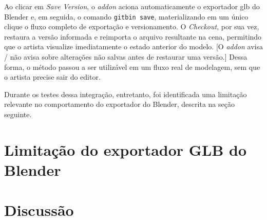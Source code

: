 Ao clicar em \textit{Save Version}, o \textit{addon} aciona automaticamente o exportador \gls{glb} do Blender e, em seguida, o comando \texttt{gitbin save}, materializando em um único clique o fluxo completo de exportação e versionamento. O \textit{Checkout}, por sua vez, restaura a versão informada e reimporta o arquivo resultante na cena, permitindo que o artista visualize imediatamente o estado anterior do modelo. [O \textit{addon} avisa / não avisa sobre alterações não salvas antes de restaurar uma versão.] Dessa forma, o método passou a ser utilizável em um fluxo real de modelagem, sem que o artista precise sair do editor.

Durante os testes dessa integração, entretanto, foi identificada uma limitação relevante no comportamento do exportador do Blender, descrita na seção seguinte.

\section{Limitação do exportador GLB do Blender}\label{sec:limitacao-exportador}

\section{Discussão}\label{sec:discussao}
